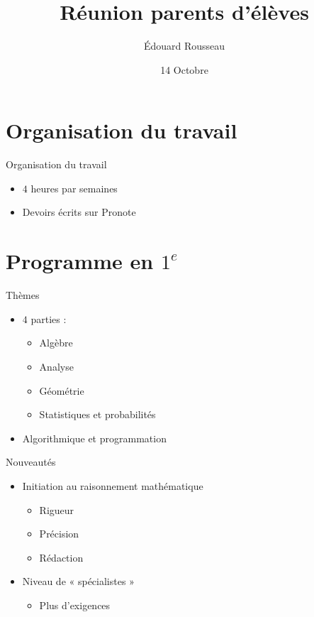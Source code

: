 \documentclass[17pt,xcolor=x11names]{beamer}
\begin{document}
\begin{frame}
  \title{Réunion parents d'élèves}
  \author{Édouard Rousseau \\}
\date{14 Octobre}
\titlepage
\end{frame}

\section*{Organisation du travail}
\begin{frame}{Organisation du travail}
  \begin{itemize}
    \item $4$ heures par semaines
    \item Devoirs écrits sur Pronote
  \end{itemize}
\end{frame}

\section*{Programme en $1^e$}
\begin{frame}{Thèmes}
  \begin{itemize}
    \item $4$ parties :
      \begin{itemize}
        \item Algèbre
        \item Analyse
        \item Géométrie
        \item Statistiques et probabilités
      \end{itemize}
    \item Algorithmique et programmation
      \end{itemize}
\end{frame}

\begin{frame}{Nouveautés}
  \begin{itemize}
    \item Initiation au raisonnement mathématique
      \begin{itemize}
        \item Rigueur
        \item Précision
        \item Rédaction
      \end{itemize}
    \item Niveau de « spécialistes »
      \begin{itemize}
        \item Plus d'exigences
      \end{itemize}
  \end{itemize}
\end{frame}
\end{document}
